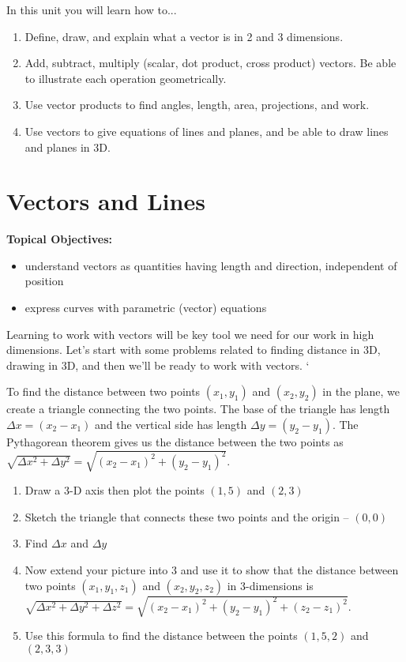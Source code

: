 \noindent 
In this unit you will learn how to...
\begin{enumerate}
\item Define, draw, and explain what a vector is in 2 and 3 dimensions.
\item Add, subtract, multiply (scalar, dot product, cross product) vectors. Be able to illustrate each operation geometrically.
\item Use vector products to find angles, length, area, projections, and work.
\item Use vectors to give equations of lines and planes, and be able to draw lines and planes in 3D.
\end{enumerate}

\clearpage

\normalsize
\section{Vectors and Lines}
\textbf{Topical Objectives:}
\begin{itemize}
\item understand vectors as quantities having length and direction, independent of position
\item express curves with parametric (vector) equations
\end{itemize}

Learning to work with vectors will be key tool we need for our work in high dimensions.  Let's start with some problems related to finding distance in 3D, drawing in 3D, and then we'll be ready to work with vectors.
`

\begin{problem}
To find the distance between two points $(x_1,y_1)$ and $(x_2,y_2)$ in the plane, we create a triangle connecting the two points.  The base of the triangle has length $\Delta x=(x_2-x_1)$ and the vertical side has length $\Delta y=(y_2-y_1)$. The Pythagorean theorem gives us the distance between the two points as $\sqrt{\Delta x^2+\Delta y^2}=\sqrt{(x_2-x_1)^2+(y_2-y_1)^2}$.\\

\begin{enumerate}
\item Draw a 3-D axis then plot the points $(1,5)$ and $(2,3)$
\item Sketch the triangle that connects these two points and the origin -- $(0,0)$
\item Find $\Delta x$ and $\Delta y$
\item Now extend your picture into 3 and use it to show that the distance between two points $(x_1,y_1,z_1)$ and $(x_2,y_2,z_2)$ in 3-dimensions is $\sqrt{\Delta x^2+\Delta y^2+\Delta z^2}=\sqrt{(x_2-x_1)^2+(y_2-y_1)^2+(z_2-z_1)^2}$.
\item Use this formula to find the distance between the points $(1,5,2)$ and $(2,3,3)$
\end{enumerate}
\end{problem}


